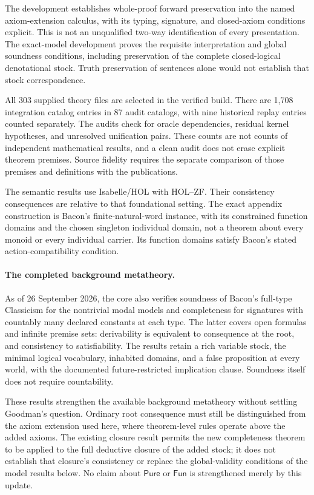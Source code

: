 \documentclass[12pt,leqno]{article}
\newcommand{\Pure}{\mathsf{Pure}}
\newcommand{\Fun}{\mathsf{Fun}}
\begin{document}
The development establishes whole-proof forward preservation into the
named axiom-extension calculus, with its typing, signature, and closed-axiom
conditions explicit. This is not an unqualified two-way identification of
every presentation. The exact-model development proves the requisite
interpretation and global soundness conditions, including preservation
of the complete closed-logical denotational stock. Truth preservation of
sentences alone would not establish that stock correspondence.

All 303 supplied theory files are selected in the verified build. There are
1,708 integration catalog entries in 87 audit catalogs, with nine historical
replay entries counted separately. The audits check for oracle dependencies,
residual kernel hypotheses, and unresolved unification pairs. These counts
are not counts of independent mathematical results, and a clean audit does
not erase explicit theorem premises. Source fidelity requires the separate
comparison of those premises and definitions with the publications.

The semantic results use Isabelle/HOL with HOL--ZF. Their consistency
consequences are relative to that foundational setting. The exact appendix
construction is Bacon's finite-natural-word instance, with its constrained
function domains and the chosen singleton individual domain, not a theorem
about every monoid or every individual carrier. Its function domains satisfy
Bacon's stated action-compatibility condition.

\paragraph{The completed background metatheory.}
As of 26 September 2026, the core also verifies soundness of Bacon's
full-type Classicism for the nontrivial modal models and completeness
for signatures with countably many declared constants at each type.
The latter covers open formulas and infinite premise sets: derivability
is equivalent to consequence at the root, and consistency to
satisfiability. The results retain a rich variable stock, the minimal
logical vocabulary, inhabited domains, and a false proposition at every
world, with the documented future-restricted implication clause.
Soundness itself does not require countability.

These results strengthen the available background metatheory without
settling Goodman's question. Ordinary root consequence must still be
distinguished from the axiom extension used here, where theorem-level
rules operate above the added axioms. The existing closure result permits
the new completeness theorem to be applied to the full deductive closure
of the added stock; it does not establish that closure's consistency or
replace the global-validity conditions of the model results below.
No claim about $\Pure$ or $\Fun$ is strengthened merely by this update.
\end{document}
